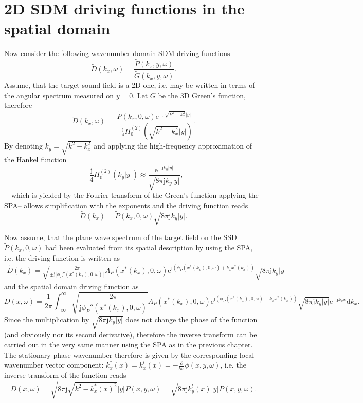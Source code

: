 \documentclass[12pt,a4paper]{article}
\newcommand{\td}{\mathrm{d}}
\newcommand{\te}{\mathrm{e}}
\newcommand{\ti}{\mathrm{j}}
\begin{document}
\null\newpage
\section{2D SDM driving functions in the spatial domain}

Now consider the following wavenumber domain SDM driving functions
\begin{equation}
\tilde{D}(k_x,\omega) = \frac{\tilde{P}(k_x,y,\omega)}{\tilde{G}(k_x,y,\omega)}.
\end{equation}
Assume, that the target sound field is a 2D one, i.e. may be written in terms of the angular spectrum measured on $y=0$. Let $G$ be the 3D Green's function, therefore
\begin{equation}
\tilde{D}(k_x,\omega) = 
\frac{\tilde{P}(k_x,0,\omega) \te^{-\ti \sqrt{k^2-k_x^2}|y|} }
{-\frac{\ti}{4} H_0^{(2)} 
\left( \sqrt{ k^2-k_x^2 }|y| \right)
 }.
\end{equation}
By denoting $k_y = \sqrt{k^2-k_x^2}$ and applying the high-frequency approximation of the Hankel function
\begin{equation}
-\frac{\ti}{4} H_0^{(2)} \left( k_y|y| \right) \approx \frac{\te^{-\ti k_y|y|}}{\sqrt{8\pi \ti k_y|y|}},
\end{equation}
---which is yielded by the Fourier-transform of the Green's function applying the SPA-- allows simplification with the exponents and the driving function reads
\begin{equation}
\tilde{D}(k_x) = \tilde{P}(k_x,0,\omega) \sqrt{8\pi \ti k_y|y| }.
\end{equation}

Now assume, that the plane wave spectrum of the target field on the SSD $\tilde{P}(k_x,0,\omega)$ had been evaluated from its spatial description by using the SPA, i.e. the driving function is written as
\begin{multline}
\tilde{D}(k_x) = \sqrt{\frac{2\pi}{\pm \ti \left|\phi_P''(x^*(k_x),0,\omega) \right|}} A_P(x^*(k_x),0,\omega) \te^{\ti (\phi_P(x^*(k_x),0,\omega)+k_x x^*(k_x)) }\sqrt{8\pi \ti k_y |y| }
\end{multline}
and the spatial domain driving function as
\begin{equation}
D(x,\omega) = \frac{1}{2\pi}\int_{-\infty}^{\infty}
\sqrt{\frac{2\pi}{\ti \phi_P''(x^*(k_x),0,\omega) }} A_P(x^*(k_x),0,\omega) \te^{\ti (\phi_P(x^*(k_x),0,\omega)+k_x x^*(k_x)) }\sqrt{8\pi \ti k_y |y| } \te^{-\ti k_x x}
\td k_x.
\end{equation}
Since the multiplication by $\sqrt{8\pi \ti k_y |y| }$ does not change the phase of the function (and obviously nor its second derivative), therefore the inverse transform can be carried out in the very same manner using the SPA as in the previous chapter. The stationary phase wavenumber therefore is given by the corresponding local wavenumber vector component: $k_x^*(x) = k_x^l(x) = -\frac{\partial}{\partial x} \phi(x,y,\omega)$, i.e. the inverse transform of the function reads
\begin{equation}
D(x,\omega) = \sqrt{8\pi \ti \sqrt{k^2 - k_x^*(x)^2}|y|} P(x,y,\omega) = \sqrt{8\pi \ti k_y^l(x) |y|} P(x,y,\omega).
\end{equation}
\end{document}
